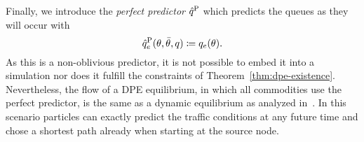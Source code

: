 Finally, we introduce the \emph{perfect predictor} $\hat q^{\text{P}}$ which predicts the queues as they will occur with \[
    \hat q^{\text{P}}_e(\theta,\bar\theta,q) \coloneqq q_e(\theta).
\]
As this is a non-oblivious predictor, it is not possible to embed it into a simulation nor does it fulfill the constraints of Theorem~\ref{thm:dpe-existence}.
Nevertheless, the flow of a DPE equilibrium, in which all commodities use the perfect predictor, is the same as a dynamic equilibrium as analyzed in~\cite[Definition~2]{Cominetti2015}.
In this scenario particles can exactly predict the traffic conditions at any future time and chose a shortest path already when starting at the source node.
